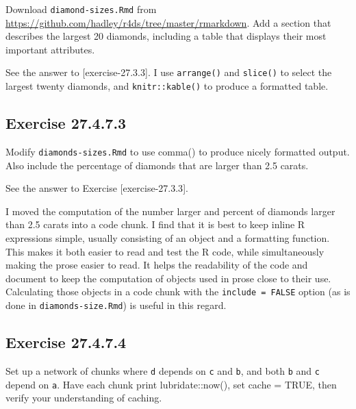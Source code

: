 \documentclass[]{book}
\theoremstyle{plain}
\theoremstyle{remark}
\begin{document}
Download \texttt{diamond-sizes.Rmd} from
\url{https://github.com/hadley/r4ds/tree/master/rmarkdown}. Add a
section that describes the largest 20 diamonds, including a table that
displays their most important attributes.

See the answer to {[}exercise-27.3.3{]}. I use \texttt{arrange()} and
\texttt{slice()} to select the largest twenty diamonds, and
\texttt{knitr::kable()} to produce a formatted table.

\hypertarget{exercise-27.4.7.3}{%
\subsection*{\texorpdfstring{Exercise
{27.4.7.3}}{Exercise 27.4.7.3}}\label{exercise-27.4.7.3}}

Modify \texttt{diamonds-sizes.Rmd} to use comma() to produce nicely
formatted output. Also include the percentage of diamonds that are
larger than 2.5 carats.

See the answer to Exercise {[}exercise-27.3.3{]}.

I moved the computation of the number larger and percent of diamonds
larger than 2.5 carats into a code chunk. I find that it is best to keep
inline R expressions simple, usually consisting of an object and a
formatting function. This makes it both easier to read and test the R
code, while simultaneously making the prose easier to read. It helps the
readability of the code and document to keep the computation of objects
used in prose close to their use. Calculating those objects in a code
chunk with the \texttt{include\ =\ FALSE} option (as is done in
\texttt{diamonds-size.Rmd}) is useful in this regard.

\hypertarget{exercise-27.4.7.4}{%
\subsection*{\texorpdfstring{Exercise
{27.4.7.4}}{Exercise 27.4.7.4}}\label{exercise-27.4.7.4}}

Set up a network of chunks where \texttt{d} depends on \texttt{c} and
\texttt{b}, and both \texttt{b} and \texttt{c} depend on \texttt{a}.
Have each chunk print lubridate::now(), set cache = TRUE, then verify
your understanding of caching.
\end{document}
